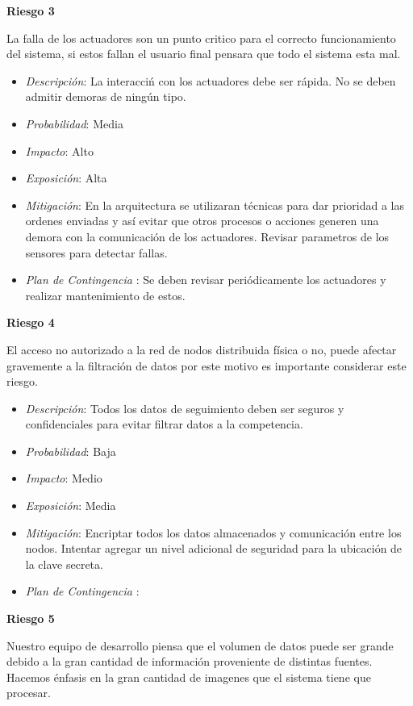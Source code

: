 \textbf{Riesgo 3}

La falla de los actuadores son un punto critico para el correcto funcionamiento del sistema, si estos fallan el usuario final pensara que todo el sistema esta mal.

\begin{itemize}
 \item \textsl{Descripci\'on}: La interacci\'n con los actuadores debe ser r\'apida. No se deben admitir demoras de ning\'un tipo.
 \item \textsl{Probabilidad}: Media 
 \item \textsl{Impacto}: Alto
 \item \textsl{Exposición}: Alta
 \item \textsl{Mitigación}: En la arquitectura se utilizaran t\'ecnicas para dar prioridad a las ordenes enviadas y as\'i evitar que otros procesos o acciones generen una demora con la comunicaci\'on de los actuadores. Revisar parametros de los sensores para detectar fallas.
 \item \textsl{Plan de Contingencia} : Se deben revisar peri\'odicamente los actuadores y realizar mantenimiento de estos.
\end{itemize}

\textbf{Riesgo 4}

El acceso no autorizado a la red de nodos distribuida f\'isica o no, puede afectar gravemente a la filtraci\'on de datos por este motivo es importante considerar este riesgo.

\begin{itemize}
 \item \textsl{Descripci\'on}: Todos los datos de seguimiento deben ser seguros y confidenciales para evitar filtrar datos a la competencia.
 \item \textsl{Probabilidad}: Baja
 \item \textsl{Impacto}: Medio
 \item \textsl{Exposición}: Media
 \item \textsl{Mitigación}: Encriptar todos los datos almacenados y comunicaci\'on entre los nodos. Intentar agregar un nivel adicional de seguridad para la ubicaci\'on de la clave secreta.
 \item \textsl{Plan de Contingencia} : 
\end{itemize}

\textbf{Riesgo 5}

Nuestro equipo de desarrollo piensa que el volumen de datos puede ser grande debido a la gran cantidad de informaci\'on proveniente de distintas fuentes.\\
Hacemos énfasis en la gran cantidad de imagenes que el sistema tiene que procesar.

